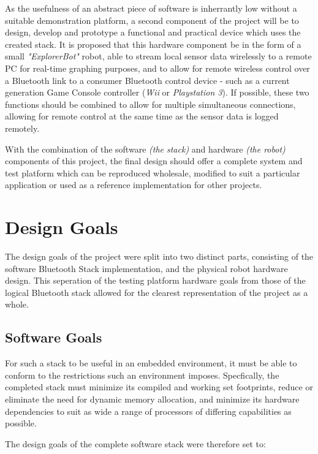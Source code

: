 As the usefulness of an abstract piece of software is inherrantly low without a suitable demonstration platform, a second component of the project will be to design, develop and prototype a functional and practical device which uses the created stack. It is proposed that this hardware component be in the form of a small \textit{"ExplorerBot"} robot, able to stream local sensor data wirelessly to a remote PC for real-time graphing purposes, and to allow for remote wireless control over a Bluetooth link to a consumer Bluetooth control device - such as a current generation Game Console controller (\textit{Wii} or \textit{Playstation 3}). If possible, these two functions should be combined to allow for multiple simultaneous connections, allowing for remote control at the same time as the sensor data is logged remotely.


With the combination of the software \emph{(the stack)} and hardware \emph{(the robot)} components of this project, the final design should offer a complete system and test platform which can be reproduced wholesale, modified to suit a particular application or used as a reference implementation for other projects.

\section{Design Goals}

The design goals of the project were split into two distinct parts, consisting of the software Bluetooth Stack implementation, and the physical robot hardware design. This seperation of the testing platform hardware goals from those of the logical Bluetooth stack allowed for the clearest representation of the project as a whole.

\subsection{Software Goals}

For such a stack to be useful in an embedded environment, it must be able to conform to the restrictions such an environment imposes. Specfically, the completed stack must minimize its compiled and working set footprints, reduce or eliminate the need for dynamic memory allocation, and minimize its hardware dependencies to suit as wide a range of processors of differing capabilities as possible.

The design goals of the complete software stack were therefore set to:

